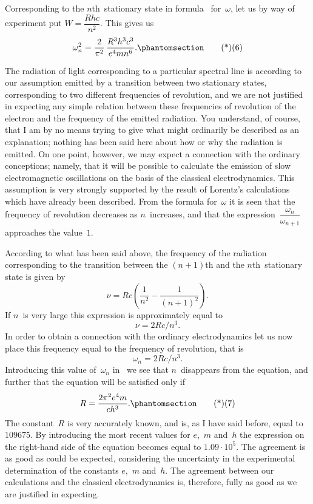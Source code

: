 Corresponding to the $n$th~stationary state in formula~ for~$\omega$,
let us by way of experiment put $W = \dfrac{Rhc}{n^{2}}$. This gives us
\[
\omega_{n}^{2} = \frac{2}{\pi^{2}}\, \frac{R^{3} h^{3} c^{3}}{e^{4} mn^{6}}.
\Tag{(6)}
\]

The radiation of light corresponding to a particular spectral line
is according to our assumption emitted by a transition between
two stationary states, corresponding to two different frequencies of
revolution, and we are not justified in expecting any simple relation
between these frequencies of revolution of the electron and
the frequency of the emitted radiation. You understand, of course,
that I am by no means trying to give what might ordinarily be
described as an explanation; nothing has been said here about
how or why the radiation is emitted. On one point, however, we
may expect a connection with the ordinary conceptions; namely,
that it will be possible to calculate the emission of slow electromagnetic
oscillations on the basis of the classical electrodynamics.
This assumption is very strongly supported by the result of
Lorentz's calculations which have already been described. From
the formula for~$\omega$ it is seen that the frequency of revolution decreases
as $n$~increases, and that the expression~$\dfrac{\omega_{n}}{\omega_{n+1}}$ approaches the
value~$1$.

According to what has been said above, the frequency of the
radiation corresponding to the transition between the $(n + 1)$th
and the $n$th~stationary state is given by
\[
\nu = Rc \left(\frac{1}{n^{2}} - \frac{1}{(n + 1)^{2}}\right).
\]
If $n$~is very large this expression is approximately equal to
\[
\nu = 2Rc/n^{3}.
\]
In order to obtain a connection with the ordinary electrodynamics
let us now place this frequency equal to the frequency of revolution,
that is
\[
\omega_{n} = 2Rc/n^{3}.
\]
Introducing this value of~$\omega_{n}$ in~ we see that $n$~disappears from
the equation, and further that the equation will be satisfied only if
\[
R = \frac{2\pi^{2} e^{4} m}{ch^{3}}.
\Tag{(7)}
\]
The constant~$R$ is very accurately known, and is, as I have said
before, equal to~$109675$. By introducing the most recent values
for $e$,~$m$ and~$h$ the expression on the right-hand side of the equation
becomes equal to $1.09 \cdot 10^{5}$. The agreement is as good as
could be expected, considering the uncertainty in the experimental
determination of the constants $e$,~$m$ and~$h$. The agreement between
our calculations and the classical electrodynamics is, therefore,
fully as good as we are justified in expecting.

